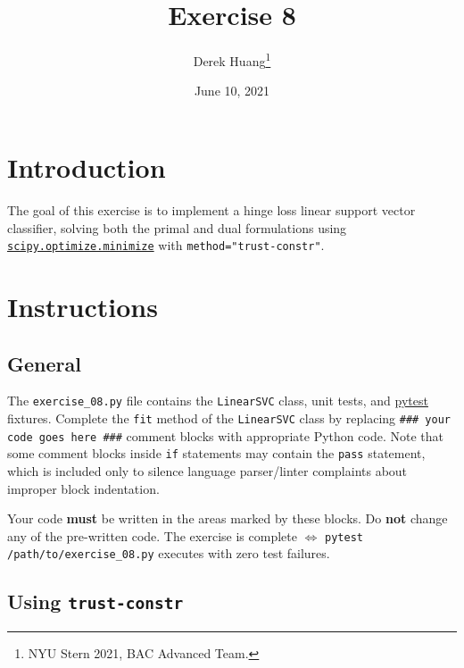 \documentclass{article}
\title{Exercise 8}
\author{Derek Huang\thanks{NYU Stern 2021, BAC Advanced Team.}}
\date{June 10, 2021}
\numberwithin{equation}{section}
\newcommand{\pytest}{\href{https://docs.pytest.org/en/stable/}{pytest}}
\newcommand{\minimize}{%
    \href{%
        https://docs.scipy.org/doc/scipy/reference/generated/%
        scipy.optimize.minimize.html%
    }{\texttt{scipy.optimize.minimize}}%
}
\begin{document}
\maketitle
\thispagestyle{fancy}


\section{Introduction}

The goal of this exercise is to implement a hinge loss linear support vector classifier, solving both the primal and dual formulations using \minimize{} with \texttt{method="trust-constr"}.

\section{Instructions}

\subsection{General}

The \texttt{exercise\_08.py} file contains the \texttt{LinearSVC} class, unit
tests, and \pytest{} fixtures. Complete the \texttt{fit} method of the 
\texttt{LinearSVC} class by replacing
\texttt{\#\#\# your code goes here \#\#\#} comment blocks with appropriate
Python code. Note that some comment blocks inside \texttt{if} statements may
contain the \texttt{pass} statement, which is included only to silence
language parser/linter complaints about improper block indentation.

\medskip

Your code \textbf{must} be written in the areas marked by these blocks. Do
\textbf{not} change any of the pre-written code. The exercise is complete
$ \Leftrightarrow $ \texttt{pytest /path/to/exercise\_08.py} executes with
zero test failures.

\subsection{Using \texttt{trust-constr}}
\end{document}
